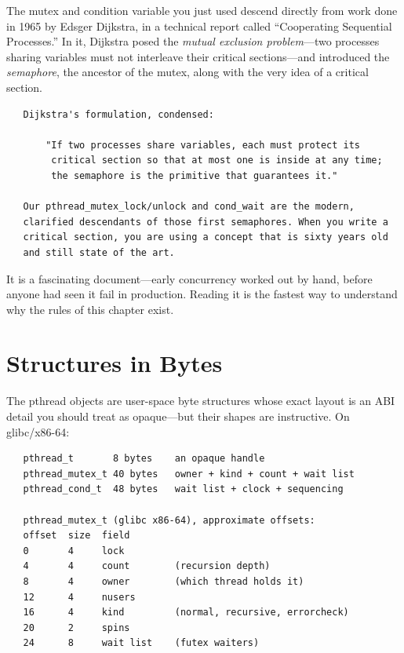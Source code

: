 \begin{researchnote}
The mutex and condition variable you just used descend directly from
work done in 1965 by Edsger Dijkstra, in a technical report called
``Cooperating Sequential Processes.'' In it, Dijkstra posed the
\emph{mutual exclusion problem}---two processes sharing variables
must not interleave their critical sections---and introduced the
\emph{semaphore}, the ancestor of the mutex, along with the very idea
of a critical section.

\begin{verbatim}
   Dijkstra's formulation, condensed:

       "If two processes share variables, each must protect its
        critical section so that at most one is inside at any time;
        the semaphore is the primitive that guarantees it."

   Our pthread_mutex_lock/unlock and cond_wait are the modern,
   clarified descendants of those first semaphores. When you write a
   critical section, you are using a concept that is sixty years old
   and still state of the art.
\end{verbatim}

It is a fascinating document---early concurrency worked out by hand,
before anyone had seen it fail in production. Reading it is the
fastest way to understand why the rules of this chapter exist.

\end{researchnote}

\section{Structures in Bytes}

The pthread objects are user-space byte structures whose exact layout
is an ABI detail you should treat as opaque---but their shapes are
instructive. On glibc/x86-64:

\begin{verbatim}
   pthread_t       8 bytes    an opaque handle
   pthread_mutex_t 40 bytes   owner + kind + count + wait list
   pthread_cond_t  48 bytes   wait list + clock + sequencing

   pthread_mutex_t (glibc x86-64), approximate offsets:
   offset  size  field
   0       4     lock
   4       4     count        (recursion depth)
   8       4     owner        (which thread holds it)
   12      4     nusers
   16      4     kind         (normal, recursive, errorcheck)
   20      2     spins
   24      8     wait list    (futex waiters)
\end{verbatim}


